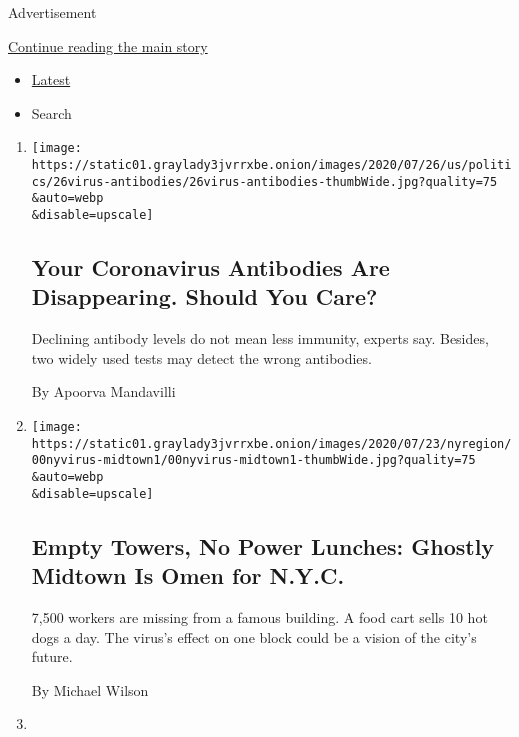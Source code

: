 Advertisement

\protect\hyperlink{after-mid1}{Continue reading the main story}

\begin{itemize}
\tightlist
\item
  \protect\hyperlink{stream-panel}{Latest}
\item
  Search
\end{itemize}

\begin{enumerate}
\def\labelenumi{\arabic{enumi}.}
\item
  \href{/2020/07/26/health/coronvirus-antibody-tests.html}{}

  \texttt{[image: https://static01.graylady3jvrrxbe.onion/images/2020/07/26/us/politics/26virus-antibodies/26virus-antibodies-thumbWide.jpg?quality=75\\\&auto=webp\\\&disable=upscale]}

  \hypertarget{your-coronavirus-antibodies-are-disappearing-should-you-care}{%
  \subsection{Your Coronavirus Antibodies Are Disappearing. Should You
  Care?}\label{your-coronavirus-antibodies-are-disappearing-should-you-care}}

  Declining antibody levels do not mean less immunity, experts say.
  Besides, two widely used tests may detect the wrong antibodies.

  By Apoorva Mandavilli
\item
  \href{/2020/07/26/nyregion/nyc-coronavirus-time-life-building.html}{}

  \texttt{[image: https://static01.graylady3jvrrxbe.onion/images/2020/07/23/nyregion/00nyvirus-midtown1/00nyvirus-midtown1-thumbWide.jpg?quality=75\\\&auto=webp\\\&disable=upscale]}

  \hypertarget{empty-towers-no-power-lunches-ghostly-midtown-is-omen-for-nyc}{%
  \subsection{Empty Towers, No Power Lunches: Ghostly Midtown Is Omen
  for
  N.Y.C.}\label{empty-towers-no-power-lunches-ghostly-midtown-is-omen-for-nyc}}

  7,500 workers are missing from a famous building. A food cart sells 10
  hot dogs a day. The virus's effect on one block could be a vision of
  the city's future.

  By Michael Wilson
\item
  \href{/2020/07/26/nyregion/metropolitan-diary.html}{}


\end{enumerate}
